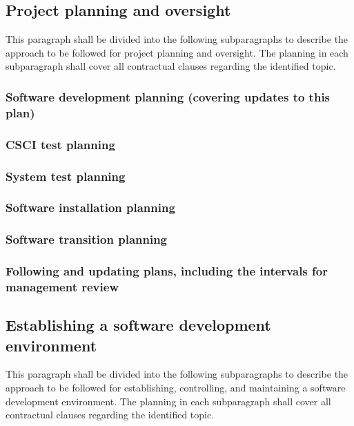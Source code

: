 \subsection{Project planning and oversight}

This paragraph shall be divided into the following subparagraphs to
describe the approach to be followed for project planning and oversight.
The planning in each subparagraph shall cover all contractual clauses
regarding the identified topic.

\subsubsection{Software development planning (covering updates to this
plan)}

\subsubsection{CSCI test planning}

\subsubsection{System test planning}

\subsubsection{Software installation planning}

\subsubsection{Software transition planning}

\subsubsection{Following and updating plans, including the intervals
for management review}

\subsection{Establishing a software development environment}

This paragraph shall be divided into the following subparagraphs to
describe the approach to be followed for establishing, controlling, and
maintaining a software development environment. The planning in each
subparagraph shall cover all contractual clauses regarding the
identified topic.

